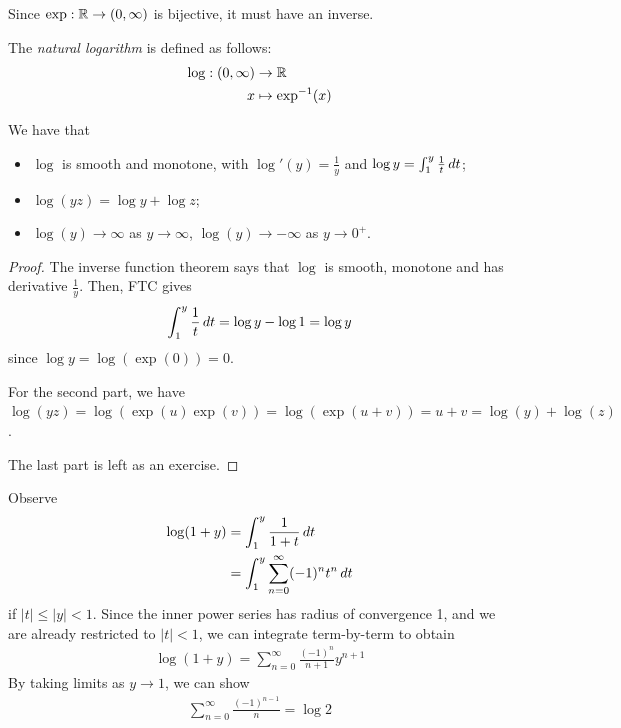 \documentclass{../template/note}
\begin{document}
    Since \(\exp: \mathbb R \to (0, \infty)\) is bijective, it must have an inverse.
    
    \begin{definition}
        The \emph{natural logarithm} is defined as follows:
        \begin{align*}
            \log: (0, \infty) &\to \mathbb R \\
            x &\mapsto \exp^{-1}(x)
        \end{align*}
    \end{definition}
    
    \begin{lemma}
        We have that
        \begin{itemize}
            \item \(\log\) is smooth and monotone, with \(\log'(y) = \frac 1 y\) and \(\log y = \int_1^y \frac 1 t \,d{t}\);
            \item \(\log(yz) = \log y + \log z\);
            \item \(\log(y) \to \infty\) as \(y \to \infty\), \(\log(y) \to -\infty\) as \(y \to 0^+\).
        \end{itemize}
    \end{lemma}
    
    \begin{proof}
        The inverse function theorem says that \(\log\) is smooth, monotone and has derivative \(\frac 1 y\). Then, FTC gives
        \begin{align*}
            \int_1^y \frac 1 t \,d{t} = \log y - \log 1 = \log y
        \end{align*}
        since \(\log y = \log(\exp(0)) = 0\).        

        For the second part, we have \(\log(yz) = \log(\exp(u)\exp(v)) = \log(\exp(u+v)) = u + v = \log(y) + \log(z)\).

        The last part is left as an exercise.
    \end{proof}
    
    \begin{remark*}
        Observe
        \begin{align*}
            \log(1+y) &= \int_1^y \frac 1{1+t} \,d{t} \\
            &= \int_1^y \sum_{n=0}^\infty (-1)^n t^n \,d{t}
        \end{align*}
        if \(|t| \leq |y| < 1\). Since the inner power series has radius of convergence 1, and we are already restricted to \(|t| < 1\), we can integrate term-by-term to obtain
        \begin{align*}
            \log(1+y) = \sum_{n=0}^\infty \frac{(-1)^n}{n+1}y^{n+1}
        \end{align*}
        By taking limits as \(y \to 1\), we can show
        \begin{align*}
            \sum_{n=0}^\infty \frac{(-1)^{n-1}}{n} = \log 2
        \end{align*}
    \end{remark*}
    
\end{document}
